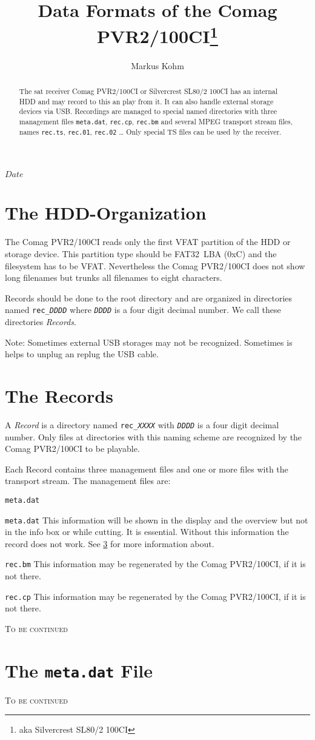 \documentclass{scrartcl}
\newcommand*{\Comag}{Comag PVR2/100CI\xspace}
\begin{document}
\title{Data Formats of the Comag PVR2/100CI\footnote{aka Silvercrest SL80/2
    100CI}}
\author{Markus Kohm}
\SVNdate $Date$
\maketitle
\begin{abstract}
  The sat receiver Comag PVR2/100CI or Silvercrest SL80/2 100CI has an
  internal HDD and may record to this an play from it. It can also handle
  external storage devices via USB. Recordings are managed to special named
  directories with three management files \texttt{meta.dat}, \texttt{rec.cp},
  \texttt{rec.bm} and several MPEG transport stream files, names
  \texttt{rec.ts}, \texttt{rec.01}, \texttt{rec.02} \dots
  Only special TS files can be used by the receiver.
\end{abstract}

\tableofcontents

\section{The HDD-Organization}
\label{sec:hdd-organization}

The \Comag reads only the first VFAT partition of the HDD or storage
device. This partition type should be FAT32~LBA (0xC) and the filesystem has
to be VFAT. Nevertheless the \Comag does not show long filenames but trunks
all filenames to eight characters.

Records should be done to the root directory and are organized in directories
named \texttt{rec\_\textit{DDDD}} where \texttt{\textit{DDDD}} is a four digit
decimal number. We call these directories \emph{Records}.

Note: Sometimes external USB storages may not be recognized. Sometimes is
helps to unplug an replug the USB cable.

\section{The Records}
\label{sec:records}

A \emph{Record} is a directory named \texttt{rec\_\textit{XXXX}} with
\texttt{\textit{DDDD}} is a four digit decimal number. Only files at
directories with this naming scheme are recognized by the \Comag to be
playable.

Each Record contains three management files and one or more files with the
transport stream. The management files are:
\begin{labeling}[:]{\texttt{meta.dat}}
\item [\texttt{meta.dat}] This information will be shown in the display and
  the overview but not in the info box or while cutting. It is
  essential. Without this information the record does not work. See
  \ref{sec:meta.dat-file} for more information about.
\item [\texttt{rec.bm}] This information may be regenerated by the \Comag, if
  it is not there.
\item [\texttt{rec.cp}] This information may be regenerated by the \Comag, if
  it is not there.
\end{labeling}

\textsc{To be continued}

\section{The \texttt{meta.dat} File}
\label{sec:meta.dat-file}

\textsc{To be continued}
\end{document}
